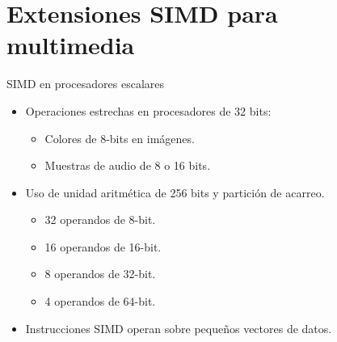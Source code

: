 \section{Extensiones SIMD para multimedia}

\begin{frame}[t]{SIMD en procesadores escalares}
\begin{itemize}
  \item Operaciones estrechas en procesadores de 32 bits:
    \begin{itemize}
      \item Colores de 8-bits en imágenes.
      \item Muestras de audio de 8 o 16 bits.
    \end{itemize}

  \item Uso de unidad aritmética de 256 bits y partición de acarreo.
    \begin{itemize}
      \item 32 operandos de 8-bit.
      \item 16 operandos de 16-bit.
      \item 8 operandos de 32-bit.
      \item 4 operandos de 64-bit.
    \end{itemize}

  \item Instrucciones SIMD operan sobre pequeños vectores de datos.
\end{itemize}
\end{frame}

